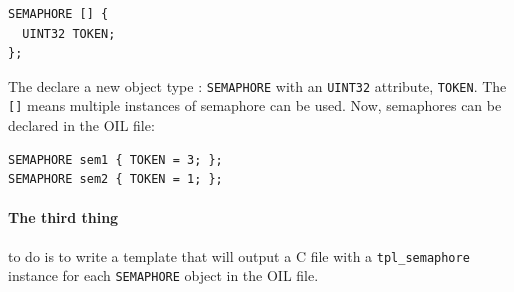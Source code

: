 \documentclass[11pt]{article}
\begin{document}
\begin{lstlisting}
SEMAPHORE [] {
  UINT32 TOKEN;
};
\end{lstlisting}

The declare a new object type : \lstinline{SEMAPHORE} with an \lstinline{UINT32} attribute, \lstinline{TOKEN}. The \lstinline{[]} means multiple instances of semaphore can be used.
Now, semaphores can be declared in the OIL file:

\begin{lstlisting}
SEMAPHORE sem1 { TOKEN = 3; };
SEMAPHORE sem2 { TOKEN = 1; };
\end{lstlisting}

\paragraph{The third thing} to do is to write a template that will output a C file with a \lstinline{tpl_semaphore} instance for each \lstinline{SEMAPHORE} object in the OIL file. 
\end{document}
